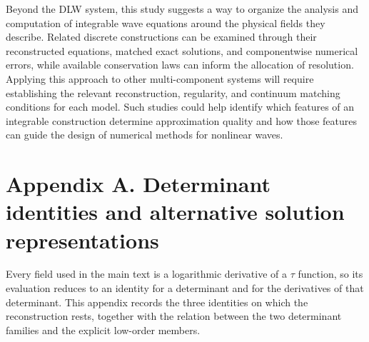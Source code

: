 \documentclass{article}
\theoremstyle{plain}
\theoremstyle{definition}
\begin{document}
Beyond the DLW system, this study suggests a way to organize the analysis and computation of integrable wave equations around the physical fields they describe. Related discrete constructions can be examined through their reconstructed equations, matched exact solutions, and componentwise numerical errors, while available conservation laws can inform the allocation of resolution. Applying this approach to other multi-component systems will require establishing the relevant reconstruction, regularity, and continuum matching conditions for each model. Such studies could help identify which features of an integrable construction determine approximation quality and how those features can guide the design of numerical methods for nonlinear waves.

\section*{Appendix A. Determinant identities and alternative solution representations}

Every field used in the main text is a logarithmic derivative of a \(\tau\) function, so its evaluation reduces to an identity for a determinant and for the derivatives of that determinant. This appendix records the three identities on which the reconstruction rests, together with the relation between the two determinant families and the explicit low-order members.
\end{document}
